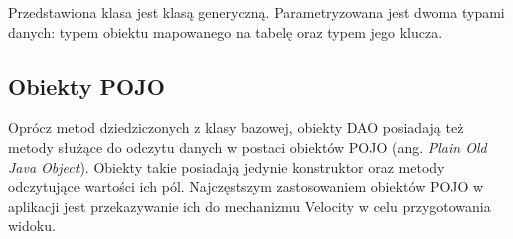 Przedstawiona klasa jest klasą generyczną. Parametryzowana jest dwoma typami danych: typem obiektu mapowanego na tabelę oraz typem jego klucza. 

\subsection[Obiekty POJO][Obiekty POJO]{Obiekty POJO}
Oprócz metod dziedziczonych z klasy bazowej, obiekty DAO posiadają też metody służące do odczytu danych w postaci obiektów POJO (ang. \textit{Plain Old Java Object}).
Obiekty takie posiadają jedynie konstruktor oraz metody odczytujące wartości ich pól. Najczęstszym zastosowaniem obiektów POJO w aplikacji jest przekazywanie ich do mechanizmu Velocity w celu przygotowania widoku.

\begin{comment}
Metody bazowej klasy DAO zwracają obiekty trwałe. Powoduje to często niepotrzebny narzut wydajnościowy. Rozwiązaniem tego problemu jest wykorzystanie, niepowiązanych z sesją Hibernate, obiektów POJO (ang. \textit{Plain Old Java Object}). Wydruk \ref{pojo} zawiera metodę DAO zwracającą listę obiektów POJO opisujących umowę. Metoda ta dokonuje złączenia tabel już na etapie zapytania HQL.

\begin{lstlisting}[language=Java,style=outcode,showstringspaces=false,caption=Metoda DAO zwracająca listę obiektów POJO opisujących umowę,label={pojo}]
public class UmowaDao extends AbstractDao<String, Umowa> {

	public static final String SIMPLE_UMOWA_POJO = 
		"pl.waw.mizinski.umowy.pojo.SimpleUmowaPOJO("
		+ "u.nrUmowy, u.typUmowy.nazwa, p.nazwisko, p.pierwszeImie, " +
		"p.imionaPozostale, z.typZadania.typZadaniaPK.jednostkaOrganizacyjna.nazwa,"
		+ "z.nazwa, u.wynagrodzenie, count(r.rachunekPK.nrRachunku))";

	...

	public List<SimpleUmowaPOJO> getAllSimpleUmowaPOJOs() {
		Query query = session().createQuery("select new " + SIMPLE_UMOWA_POJO +
			"from Rachunek r right join r.rachunekPK.umowa u left join u.pracownik p"
			+ " left join u.zadanie z group by u.nrUmowy, p.id, z.id");
		return HibernateUtils.queryResult(session(), query);
	}
	
	...
}
\end{lstlisting}

Jak łatwo zauważyć obiekty POJO nadają się jedynie od odczytu danych. Zapis oraz modyfikacja odbywają się już przy użyciu obiektów trwałych. Najczęstszym zastosowaniem obiektów POJO w aplikacji jest przekazywanie ich do mechanizmu Velocity w celu przygotowania widoku.

\end{comment}


